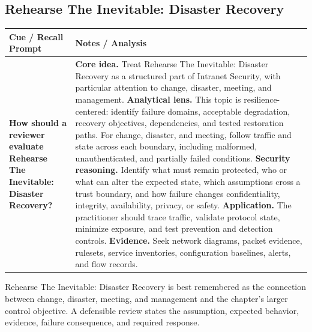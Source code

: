 \documentclass[11pt]{article}
\newcommand{\CornellHeader}{%
\rowcolor{Navy}\color{white}\bfseries Cue / Recall Prompt & \color{white}\bfseries Notes / Analysis\\\hline}
\newcommand{\CornellRow}[2]{%
\cellcolor{CueGray}\RaggedRight\textbf{#1} & \RaggedRight #2\\\hline}
\begin{document}
\subsection*{Rehearse The Inevitable: Disaster Recovery}
\begin{longtable}{>{\RaggedRight\arraybackslash}p{}|>{\RaggedRight\arraybackslash}p{}}
\CornellHeader
\CornellRow{How should a reviewer evaluate Rehearse The Inevitable: Disaster Recovery?}{\textbf{Core idea.} Treat Rehearse The Inevitable: Disaster Recovery as a structured part of Intranet Security, with particular attention to change, disaster, meeting, and management. \textbf{Analytical lens.} This topic is resilience-centered: identify failure domains, acceptable degradation, recovery objectives, dependencies, and tested restoration paths. For change, disaster, and meeting, follow traffic and state across each boundary, including malformed, unauthenticated, and partially failed conditions. \textbf{Security reasoning.} Identify what must remain protected, who or what can alter the expected state, which assumptions cross a trust boundary, and how failure changes confidentiality, integrity, availability, privacy, or safety. \textbf{Application.} The practitioner should trace traffic, validate protocol state, minimize exposure, and test prevention and detection controls. \textbf{Evidence.} Seek network diagrams, packet evidence, rulesets, service inventories, configuration baselines, alerts, and flow records.}
\end{longtable}
\begin{topicsummary}
Rehearse The Inevitable: Disaster Recovery is best remembered as the connection between change, disaster, meeting, and management and the chapter's larger control objective. A defensible review states the assumption, expected behavior, evidence, failure consequence, and required response.
\end{topicsummary}
\end{document}
